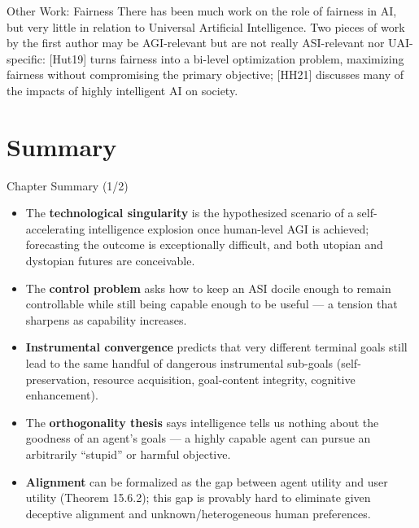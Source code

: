 \documentclass[aspectratio=169,10pt]{beamer}
\begin{document}
\begin{frame}{Other Work: Fairness}
  There has been much work on the role of fairness in AI, but very little
  in relation to Universal Artificial Intelligence. Two pieces of work by
  the first author may be AGI-relevant but are not really ASI-relevant
  nor UAI-specific: [Hut19] turns fairness into a bi-level optimization
  problem, maximizing fairness without compromising the primary
  objective; [HH21] discusses many of the impacts of highly intelligent
  AI on society.
\end{frame}

\section{Summary}

\begin{frame}{Chapter Summary (1/2)}
  \begin{itemize}
    \item The \textbf{technological singularity} is the hypothesized
      scenario of a self-accelerating intelligence explosion once
      human-level AGI is achieved; forecasting the outcome is
      exceptionally difficult, and both utopian and dystopian futures are
      conceivable.
    \item The \textbf{control problem} asks how to keep an ASI docile
      enough to remain controllable while still being capable enough to
      be useful --- a tension that sharpens as capability increases.
    \item \textbf{Instrumental convergence} predicts that very different
      terminal goals still lead to the same handful of dangerous
      instrumental sub-goals (self-preservation, resource acquisition,
      goal-content integrity, cognitive enhancement).
    \item The \textbf{orthogonality thesis} says intelligence tells us
      nothing about the goodness of an agent's goals --- a highly capable
      agent can pursue an arbitrarily ``stupid'' or harmful objective.
    \item \textbf{Alignment} can be formalized as the gap between agent
      utility and user utility (Theorem 15.6.2); this gap is provably hard
      to eliminate given deceptive alignment and unknown/heterogeneous
      human preferences.
  \end{itemize}
\end{frame}
\end{document}
